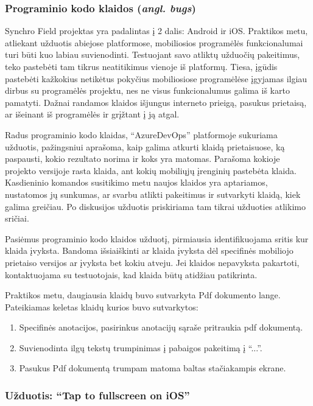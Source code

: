 \subsubsection{Programinio kodo klaidos (\emph{angl. bugs})}
Synchro Field projektas yra padalintas į 2 dalis: Android ir iOS. Praktikos metu, atliekant užduotis abiejose platformose, mobiliosios programėlės funkcionalumai turi būti kuo labiau suvienodinti. Testuojant savo atliktų užduočių pakeitimus, teko pastebėti tam tikrus neatitikimus vienoje iš platformų. Tiesa, įgūdis pastebėti kažkokius netikėtus pokyčius mobiliosiose programėlėse įgyjamas ilgiau dirbus su programėlės projektu, nes ne visus funkcionalumus galima iš karto pamatyti. Dažnai randamos klaidos išjungus interneto prieigą, pasukus prietaisą, ar išeinant iš programėlės ir grįžtant į ją atgal.


Radus programinio kodo klaidas, \enquote{AzureDevOps} platformoje sukuriama užduotis, pažingsniui aprašoma, kaip galima atkurti klaidą prietaisuose, ką paspausti, kokio rezultato norima ir koks yra matomas. Parašoma kokioje projekto versijoje rasta klaida, ant kokių mobiliųjų įrenginių pastebėta klaida. Kasdieninio komandos susitikimo metu naujos klaidos yra aptariamos, nustatomos jų sunkumas, ar svarbu atlikti pakeitimus ir sutvarkyti klaidą, kiek galima greičiau. Po diskusijos užduotis priskiriama tam tikrai užduoties atlikimo sričiai.

Pasiėmus programinio kodo klaidos užduotį, pirmiausia identifikuojama sritis kur klaida įvyksta. Bandoma išsiaiškinti ar klaida įvyksta dėl specifinės mobiliojo prietaiso versijos ar įvyksta bet kokiu atveju. Jei klaidos nepavyksta pakartoti, kontaktuojama su testuotojais, kad klaida būtų atidžiau patikrinta. 

Praktikos metu, daugiausia klaidų buvo sutvarkyta Pdf dokumento lange. Pateikiamas keletas klaidų kurios buvo sutvarkytos:
\begin{enumerate}
    \item Specifinės anotacijos, pasirinkus anotacijų sąraše pritraukia pdf dokumentą.
    \item Suvienodinta ilgų tekstų trumpinimas į pabaigos pakeitimą į \enquote{...}.
    \item Pasukus Pdf dokumentą trumpam matoma baltas stačiakampis ekrane.
\end{enumerate}

\subsubsection{Užduotis: \enquote{Tap to fullscreen on iOS}}

